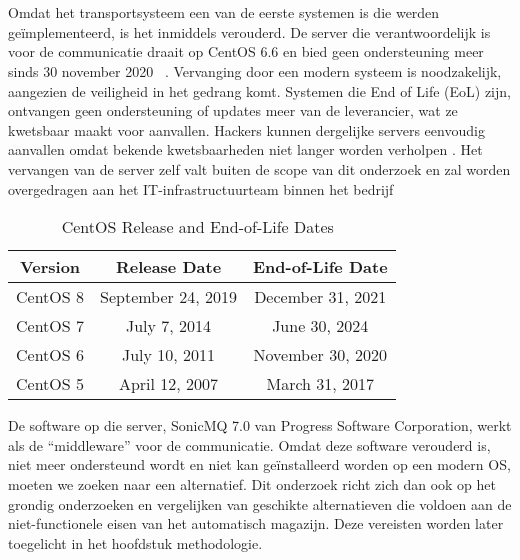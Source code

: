 \section{}%
\label{sec:Het onderwerp}
Omdat het transportsysteem een van de eerste systemen is die werden geïmplementeerd, is het inmiddels verouderd. 
De server die verantwoordelijk is voor de communicatie draait op CentOS 6.6 en bied geen ondersteuning meer sinds 30 november 2020 ~\autocite{Reock2020}.
Vervanging door een modern systeem is noodzakelijk, aangezien de veiligheid in het gedrang komt.
Systemen die End of Life (EoL) zijn, ontvangen geen ondersteuning of updates meer van de leverancier, 
wat ze kwetsbaar maakt voor aanvallen.
Hackers kunnen dergelijke servers eenvoudig aanvallen omdat bekende kwetsbaarheden niet langer worden verholpen \autocite{Mittal2024}.
Het vervangen van de server zelf valt buiten de scope van dit onderzoek en zal worden overgedragen aan het IT-infrastructuurteam binnen het bedrijf
\begin{table}[h!]
  \centering
  \begin{tabular}{|c|c|c|}
      \hline
      \textbf{Version} & \textbf{Release Date} & \textbf{End-of-Life Date} \\
      \hline
      CentOS 8 & September 24, 2019 & December 31, 2021 \\
      \hline
      CentOS 7 & July 7, 2014 & June 30, 2024 \\
      \hline
      CentOS 6 & July 10, 2011 & November 30, 2020 \\
      \hline
      CentOS 5 & April 12, 2007 & March 31, 2017 \\
      \hline
  \end{tabular}
  \caption{CentOS Release and End-of-Life Dates~\autocite{Reock2020}}
  \label{tab:centos6}
\end{table}
\newline
 
De software op die server, SonicMQ 7.0 van Progress Software Corporation, werkt als de ``middleware'' voor de communicatie.
Omdat deze software verouderd is, niet meer ondersteund wordt en niet kan geïnstalleerd worden op een modern OS, moeten we zoeken naar een alternatief.
Dit onderzoek richt zich dan ook op het grondig onderzoeken en vergelijken van geschikte alternatieven die voldoen aan de 
niet-functionele eisen van het automatisch magazijn. Deze vereisten worden later toegelicht in het hoofdstuk methodologie.
\newline

